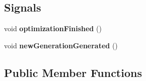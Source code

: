 \subsection*{Signals}
\begin{DoxyCompactItemize}
\item 
\mbox{\label{class_genetic_optimizer_ad51ae7c1b9048c2d9df23269ac9281c8}} 
void {\bfseries optimization\+Finished} ()
\item 
\mbox{\label{class_genetic_optimizer_ab01f9fc4d56f6eccc80b2ed61ca91c0f}} 
void {\bfseries new\+Generation\+Generated} ()
\end{DoxyCompactItemize}
\subsection*{Public Member Functions}
